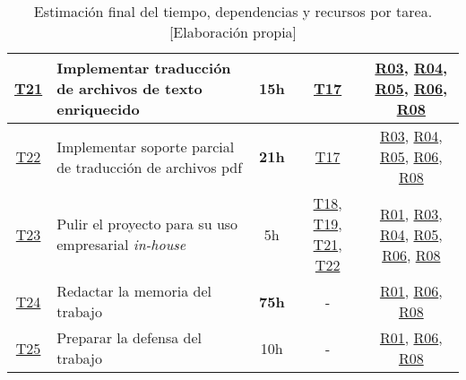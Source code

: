\begin{landscape}
\begin{table}
\begin{tabular}{ | c | l | c | c | c | }
        \hline
        \hyperref[T21]{T21} & Implementar traducción de archivos de texto enriquecido & 15h & \hyperref[T17]{T17} & \hyperref[R03]{R03}, \hyperref[R04]{R04}, \hyperref[R05]{R05}, \hyperref[R06]{R06}, \hyperref[R08]{R08} \\
        \hline
        \hyperref[T22]{T22} & Implementar soporte parcial de traducción de archivos pdf & \textbf{21h} & \hyperref[T17]{T17} & \hyperref[R03]{R03}, \hyperref[R04]{R04}, \hyperref[R05]{R05}, \hyperref[R06]{R06}, \hyperref[R08]{R08} \\
        \hline
        \hyperref[T23]{T23} & Pulir el proyecto para su uso empresarial \textit{in-house} & 5h & \hyperref[T18]{T18}, \hyperref[T19]{T19}, \hyperref[T20]{T21}, \hyperref[T22]{T22} & \hyperref[R01]{R01}, \hyperref[R03]{R03}, \hyperref[R04]{R04}, \hyperref[R05]{R05}, \hyperref[R06]{R06}, \hyperref[R08]{R08} \\
        \hline
        \hyperref[T24]{T24} & Redactar la memoria del trabajo & \textbf{75h} & - & \hyperref[R01]{R01}, \hyperref[R06]{R06}, \hyperref[R08]{R08} \\
        \hline
        \hyperref[T25]{T25} & Preparar la defensa del trabajo & 10h & - & \hyperref[R01]{R01}, \hyperref[R06]{R06}, \hyperref[R08]{R08} \\
        \hline
    \end{tabular}
    \caption{Estimación final del tiempo, dependencias y recursos por tarea. [Elaboración propia]}
    \end{table}
\end{landscape}
\restoregeometry\clearpage




